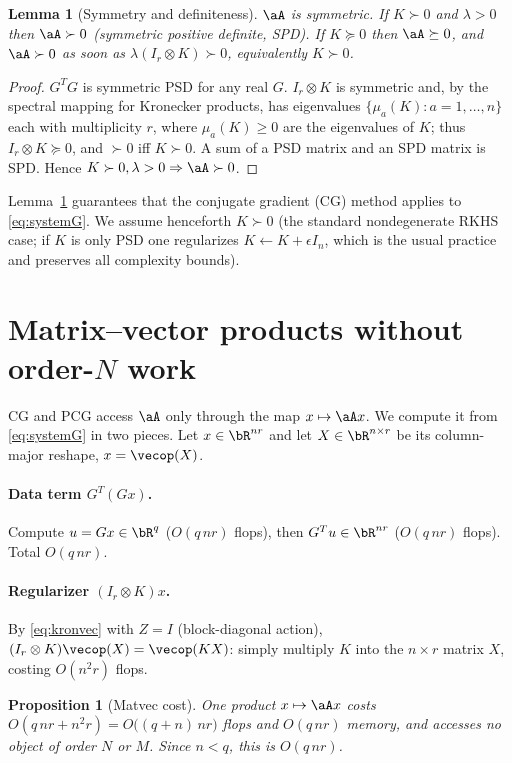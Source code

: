 \documentclass[12pt]{article}
\newtheorem{lemma}{Lemma}
\newtheorem{proposition}{Proposition}
\theoremstyle{definition}
\begin{document}
\begin{lemma}[Symmetry and definiteness]\label{lem:spd}
$\aA$ is symmetric. If $K\succ0$ and $\lambda>0$ then $\aA\succ0$
(symmetric positive definite, SPD). If $K\succeq0$ then $\aA\succeq0$, and
$\aA\succ0$ as soon as $\lambda(I_r\otimes K)\succ0$, equivalently $K\succ0$.
\end{lemma}

\begin{proof}
$G^{T}G$ is symmetric PSD for any real $G$. $I_r\otimes K$ is symmetric and, by
the spectral mapping for Kronecker products, has eigenvalues
$\{\mu_a(K):a=1,\dots,n\}$ each with multiplicity $r$, where $\mu_a(K)\ge0$ are
the eigenvalues of $K$; thus $I_r\otimes K\succeq0$, and $\succ0$ iff $K\succ0$.
A sum of a PSD matrix and an SPD matrix is SPD. Hence $K\succ0,\lambda>0\Rightarrow\aA\succ0$.
\end{proof}

Lemma~\ref{lem:spd} guarantees that the conjugate gradient (CG) method applies
to \eqref{eq:systemG}. We assume henceforth $K\succ0$ (the standard
nondegenerate RKHS case; if $K$ is only PSD one regularizes
$K\leftarrow K+\epsilon I_n$, which is the usual practice and preserves all
complexity bounds).

\section{Matrix--vector products without order-\texorpdfstring{$N$}{N} work}

CG and PCG access $\aA$ only through the map $x\mapsto \aA x$. We compute it
from \eqref{eq:systemG} in two pieces. Let $x\in\bR^{nr}$ and let
$X\in\bR^{n\times r}$ be its column-major reshape, $x=\vecop(X)$.

\paragraph{Data term $G^{T}(Gx)$.}
Compute $u=Gx\in\bR^{q}$ ($O(q\,nr)$ flops), then $G^{T}u\in\bR^{nr}$
($O(q\,nr)$ flops). Total $O(q\,nr)$.

\paragraph{Regularizer $(I_r\otimes K)x$.}
By \eqref{eq:kronvec} with $Z=I$ (block-diagonal action),
$(I_r\otimes K)\vecop(X)=\vecop(KX)$: simply multiply $K$ into the $n\times r$
matrix $X$, costing $O(n^2r)$ flops.

\begin{proposition}[Matvec cost]\label{prop:matvec}
One product $x\mapsto\aA x$ costs $O(q\,nr+n^{2}r)=O\big((q+n)\,nr\big)$ flops
and $O(q\,nr)$ memory, and accesses no object of order $N$ or $M$. Since
$n<q$, this is $O(q\,nr)$.
\end{proposition}
\end{document}
